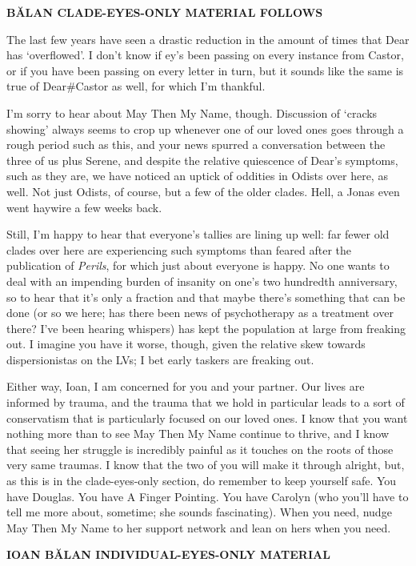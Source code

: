 \textbf{BĂLAN CLADE-EYES-ONLY MATERIAL FOLLOWS}

The last few years have seen a drastic reduction in the amount of times that Dear has `overflowed'. I don't know if ey's been passing on every instance from Castor, or if you have been passing on every letter in turn, but it sounds like the same is true of Dear\#Castor as well, for which I'm thankful.

I'm sorry to hear about May Then My Name, though. Discussion of `cracks showing' always seems to crop up whenever one of our loved ones goes through a rough period such as this, and your news spurred a conversation between the three of us plus Serene, and despite the relative quiescence of Dear's symptoms, such as they are, we have noticed an uptick of oddities in Odists over here, as well. Not just Odists, of course, but a few of the older clades. Hell, a Jonas even went haywire a few weeks back.

Still, I'm happy to hear that everyone's tallies are lining up well: far fewer old clades over here are experiencing such symptoms than feared after the publication of \emph{Perils}, for which just about everyone is happy. No one wants to deal with an impending burden of insanity on one's two hundredth anniversary, so to hear that it's only a fraction and that maybe there's something that can be done (or so we here; has there been news of psychotherapy as a treatment over there? I've been hearing whispers) has kept the population at large from freaking out. I imagine you have it worse, though, given the relative skew towards dispersionistas on the LVs; I bet early taskers are freaking out.

Either way, Ioan, I am concerned for you and your partner. Our lives are informed by trauma, and the trauma that we hold in particular leads to a sort of conservatism that is particularly focused on our loved ones. I know that you want nothing more than to see May Then My Name continue to thrive, and I know that seeing her struggle is incredibly painful as it touches on the roots of those very same traumas. I know that the two of you will make it through alright, but, as this is in the clade-eyes-only section, do remember to keep yourself safe. You have Douglas. You have A Finger Pointing. You have Carolyn (who you'll have to tell me more about, sometime; she sounds fascinating). When you need, nudge May Then My Name to her support network and lean on hers when you need.

\textbf{IOAN BĂLAN INDIVIDUAL-EYES-ONLY MATERIAL}

